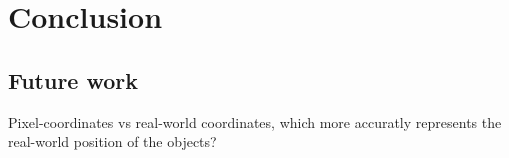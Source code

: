 
\chapter{Conclusion}\label{ch:conclusion}

\section{Future work} \label{ch:conclusion_section:future-work}
Pixel-coordinates vs real-world coordinates, which more accuratly represents the real-world position of the objects?
